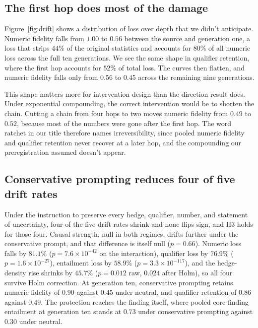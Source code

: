\documentclass{article}
\begin{document}
\subsection{The first hop does most of the damage}

Figure~\ref{fig:drift} shows a distribution of loss over depth that we didn't anticipate. Numeric fidelity falls from $1.00$ to $0.56$ between the source and generation one, a loss that strips $44\%$ of the original statistics and accounts for $80\%$ of all numeric loss across the full ten generations. We see the same shape in qualifier retention, where the first hop accounts for $52\%$ of total loss. The curves then flatten, and numeric fidelity falls only from $0.56$ to $0.45$ across the remaining nine generations.

This shape matters more for intervention design than the direction result does. Under exponential compounding, the correct intervention would be to shorten the chain. Cutting a chain from four hops to two moves numeric fidelity from $0.49$ to $0.52$, because most of the numbers were gone after the first hop. The word ratchet in our title therefore names irreversibility, since pooled numeric fidelity and qualifier retention never recover at a later hop, and the compounding our preregistration assumed doesn't appear.

\subsection{Conservative prompting reduces four of five drift rates}
\label{sec:h3}

Under the instruction to preserve every hedge, qualifier, number, and statement of uncertainty, four of the five drift rates shrink and none flips sign, and H3 holds for those four. Causal strength, null in both regimes, drifts further under the conservative prompt, and that difference is itself null ($p = 0.66$). Numeric loss falls by $81.1\%$ ($p = 7.6 \times 10^{-42}$ on the interaction), qualifier loss by $76.9\%$ ($p = 1.6 \times 10^{-27}$), entailment loss by $58.9\%$ ($p = 3.3 \times 10^{-117}$), and the hedge-density rise shrinks by $45.7\%$ ($p = 0.012$ raw, $0.024$ after Holm), so all four survive Holm correction. At generation ten, conservative prompting retains numeric fidelity of $0.90$ against $0.45$ under neutral, and qualifier retention of $0.86$ against $0.49$. The protection reaches the finding itself, where pooled core-finding entailment at generation ten stands at $0.73$ under conservative prompting against $0.30$ under neutral.
\end{document}
